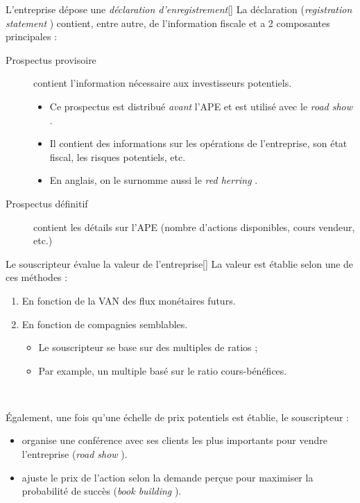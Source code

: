 \documentclass[10pt, french]{article}
\begin{document}
\begin{multicols*}{2}
\begin{definitionGENERAL}{L'entreprise dépose une \textit{déclaration d'enregistrement}}[]
La déclaration (\og \textit{registration statement} \fg{}) contient, entre autre, de l'information fiscale et a 2 composantes principales :
\begin{description}
	\item[Prospectus provisoire]	contient l'information nécessaire aux investisseurs potentiels.
		\begin{itemize}
		\item	Ce prospectus est distribué \textit{avant} l'APE et est utilisé avec le \og \textit{road show} \fg{}.
		\item	Il contient des informations sur les opérations de l'entreprise, son état fiscal, les risques potentiels, etc.
		\item	En anglais, on le surnomme aussi le \og \textit{red herring} \fg{}.
		\end{itemize}
	\item[Prospectus définitif]	contient les détails sur l'APE (nombre d'actions disponibles, cours vendeur, etc.)
\end{description}
\end{definitionGENERAL}

\begin{definitionGENERAL}{Le souscripteur évalue la valeur de l'entreprise}[]
La valeur est établie selon une de ces méthodes :
\begin{enumerate}
	\item	En fonction de la VAN des flux monétaires futurs.
	\item	En fonction de compagnies semblables.
		\begin{itemize}
		\item	Le souscripteur se base sur des multiples de ratios ;
		\item	Par example, un multiple basé sur le ratio cours-bénéfices.
		\end{itemize}
\end{enumerate}

\

Également, une fois qu'une échelle de prix potentiels est établie, le souscripteur : 
\begin{itemize}
	\item	organise une conférence avec ses clients les plus importants pour vendre l'entreprise (\og \textit{road show} \fg{}).
	\item	ajuste le prix de l'action selon la demande perçue pour maximiser la probabilité de succès (\og \textit{book building} \fg{}).
\end{itemize}
\end{definitionGENERAL}


\end{multicols*}
\end{document}
